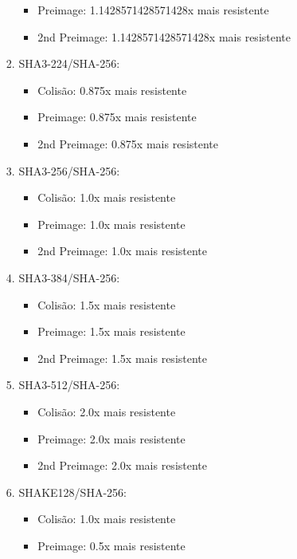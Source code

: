 \documentclass[12pt, a4paper]{article}
\begin{document}
\begin{enumerate}
\begin{enumerate}
\begin{enumerate}
\begin{itemize}
 \item Preimage: 1.1428571428571428x mais resistente

 \item 2nd Preimage: 1.1428571428571428x mais resistente
 \end{itemize}
\item SHA3-224/SHA-256:
 \begin{itemize}
 \item Colisão: 0.875x mais resistente

 \item Preimage: 0.875x mais resistente

 \item 2nd Preimage: 0.875x mais resistente
 \end{itemize}
\item SHA3-256/SHA-256:
 \begin{itemize}
 \item Colisão: 1.0x mais resistente

 \item Preimage: 1.0x mais resistente

 \item 2nd Preimage: 1.0x mais resistente
 \end{itemize}
\item SHA3-384/SHA-256:
 \begin{itemize}
 \item Colisão: 1.5x mais resistente

 \item Preimage: 1.5x mais resistente

 \item 2nd Preimage: 1.5x mais resistente
 \end{itemize}
\item SHA3-512/SHA-256:
 \begin{itemize}
 \item Colisão: 2.0x mais resistente

 \item Preimage: 2.0x mais resistente

 \item 2nd Preimage: 2.0x mais resistente
 \end{itemize}
\item SHAKE128/SHA-256:
 \begin{itemize}
 \item Colisão: 1.0x mais resistente

 \item Preimage: 0.5x mais resistente


\end{itemize}
\end{enumerate}
\end{enumerate}
\end{enumerate}
\end{document}
